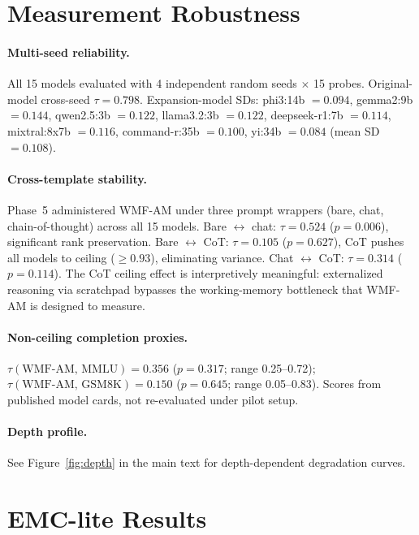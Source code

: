 \documentclass{article}
\begin{document}
\section{Measurement Robustness}
\label{app:robustness}

\paragraph{Multi-seed reliability.}
All 15 models evaluated with 4 independent random seeds $\times$ 15
probes. Original-model cross-seed $\tau = 0.798$. Expansion-model SDs:
phi3:14b $= 0.094$, gemma2:9b $= 0.144$, qwen2.5:3b $= 0.122$,
llama3.2:3b $= 0.122$, deepseek-r1:7b $= 0.114$, mixtral:8x7b $= 0.116$,
command-r:35b $= 0.100$, yi:34b $= 0.084$ (mean SD $= 0.108$).

\paragraph{Cross-template stability.}
Phase~5 administered WMF-AM under three prompt wrappers (bare, chat,
chain-of-thought) across all 15 models.
Bare $\leftrightarrow$ chat: $\tau = 0.524$ ($p = 0.006$), significant
rank preservation.
Bare $\leftrightarrow$ CoT: $\tau = 0.105$ ($p = 0.627$), CoT pushes
all models to ceiling ($\geq 0.93$), eliminating variance.
Chat $\leftrightarrow$ CoT: $\tau = 0.314$ ($p = 0.114$).
The CoT ceiling effect is interpretively meaningful: externalized
reasoning via scratchpad bypasses the working-memory bottleneck that
WMF-AM is designed to measure.

\paragraph{Non-ceiling completion proxies.}
$\tau(\text{WMF-AM, MMLU}) = 0.356$ ($p = 0.317$; range 0.25--0.72);
$\tau(\text{WMF-AM, GSM8K}) = 0.150$ ($p = 0.645$; range 0.05--0.83).
Scores from published model cards, not re-evaluated under pilot setup.

\paragraph{Depth profile.}
See Figure~\ref{fig:depth} in the main text for depth-dependent degradation curves.

\section{EMC-lite Results}
\label{app:emclite}
\end{document}
